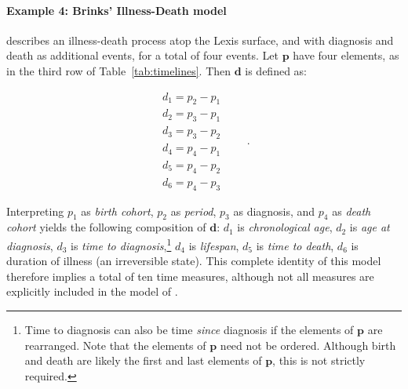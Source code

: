 \documentclass[12pt,oneside,a4paper]{article} %
\begin{document}
\paragraph{Example 4: Brinks' Illness-Death model}

\citet{brinks2014lexis} describes an illness-death process atop the Lexis
surface, and with diagnosis and death as additional events, for a total of four
events. Let $\textbf{p}$ have four elements, as in the third row of
Table~\ref{tab:timelines}. Then $\textbf{d}$ is defined as:

\begin{equation}
\label{eq:p3}
\begin{matrix}
d_1 = p_2 - p_1\\
d_2 = p_3 - p_1\\
d_3 = p_3 - p_2\\
d_4 = p_4 - p_1\\
d_5 = p_4 - p_2\\
d_6 = p_4 - p_3
\end{matrix} \quad\quad.
\end{equation}

Interpreting $p_1$ as \textit{birth cohort}, $p_2$ as \textit{period}, $p_3$ as
diagnosis, and $p_4$ as \textit{death cohort} yields the following composition
of $\textbf{d}$: $d_1$ is \textit{chronological age}, $d_2$ is \textit{age at
diagnosis}, $d_3$ is \textit{time to diagnosis},\footnote{Time to diagnosis can
also be time \textit{since} diagnosis if the elements of $\textbf{p}$ are
rearranged.
Note that the elements of $\textbf{p}$ need not be ordered. Although
birth and death are likely the first and last elements of $\textbf{p}$, this is
not strictly required.} $d_4$ is \textit{lifespan}, $d_5$ is \textit{time to death}, $d_6$ is duration of illness (an irreversible state). This complete identity of this model therefore implies a total of ten time measures, although not all measures are explicitly included in the model of \citet{brinks2014lexis}.


\end{document}
